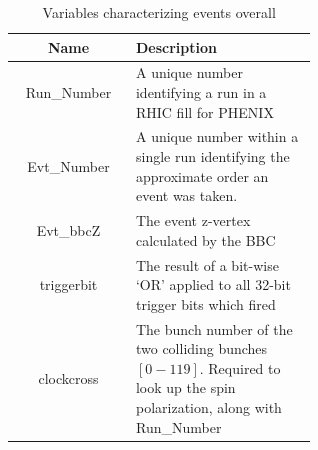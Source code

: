 \begin{table}
  \centering
  \begin{tabular}{c p{0.6\linewidth}}
      \toprule
      \textbf{Name} & \textbf{Description} \\
      \midrule
      Run\_Number & A unique number identifying a run in a RHIC fill for PHENIX \\
      Evt\_Number & A unique number within a single run identifying the approximate order an event was taken. \\
      Evt\_bbcZ & The event z-vertex calculated by the BBC \\
      triggerbit & The result of a bit-wise `OR' applied to all 32-bit trigger bits which fired \\
      clockcross & The bunch number of the two colliding bunches $[0-119]$. Required to look up the spin polarization, along with Run\_Number \\
      \bottomrule
    \end{tabular}
  \caption{Variables characterizing events overall}
  \label{tab:evt_variables}
\end{table}

